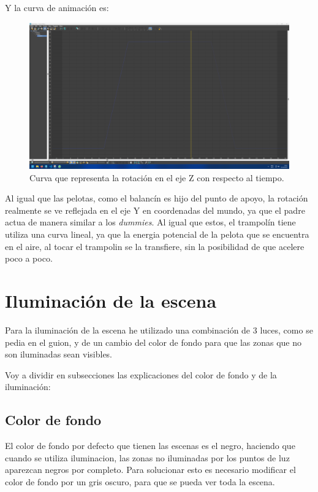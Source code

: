 \documentclass{article}
\begin{document}
Y la curva de animación es:

\begin{figure}[H]
    \centering
    \includegraphics[width=\textwidth]{imagenes/curvas/Trampolin/blue.png}
    \caption{Curva que representa la rotación en el eje Z con respecto al tiempo.}
 \end{figure}

 Al igual que las pelotas, como el balancín es hijo del punto de apoyo, la rotación realmente se ve reflejada en el eje Y en coordenadas del mundo, ya que el padre actua de manera similar a los \textit{dummies}. Al igual que estos, el trampolín tiene utiliza una curva lineal, ya que la energia potencial de la pelota que se encuentra en el aire, al tocar el trampolin se la transfiere, sin la posibilidad de que acelere poco a poco.
\section{Iluminación de la escena}
Para la iluminación de la escena he utilizado una combinación de 3 luces, como se pedia en el guion, y de un cambio del color de fondo para que las zonas que no son iluminadas sean visibles.

\bigskip

Voy a dividir en subsecciones las explicaciones del color de fondo y de la iluminación:

\subsection{Color de fondo}

El color de fondo por defecto que tienen las escenas es el negro, haciendo que cuando se utiliza iluminacion, las zonas no iluminadas por los puntos de luz aparezcan negros por completo. Para solucionar esto es necesario modificar el color de fondo por un gris oscuro, para que se pueda ver toda la escena.
\end{document}
